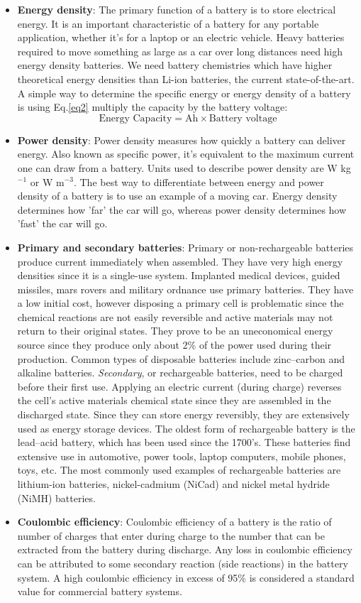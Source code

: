 \begin{itemize}
\item \textbf{Energy density}: The primary function of a battery is to store electrical energy. It is an important characteristic of a battery for any portable application, whether it’s for a laptop or an electric vehicle. Heavy batteries required to move something as large as a car over long distances need high energy density batteries. We need battery chemistries which have higher theoretical energy densities than Li-ion batteries, the current state-of-the-art. A simple way to determine the specific energy or energy density of a battery is using Eq.\ref{eq2} multiply the capacity by the battery voltage:
\begin{equation} \label{eq2}
    \text{Energy Capacity}= \text{Ah} \times \text{Battery voltage}
\end{equation}
\item \textbf{Power density}: Power density measures how quickly a battery can deliver energy. Also known as specific power, it's equivalent to the maximum current one can draw from a battery. Units used to describe power density are W kg$^{-1}$ or W m$^{-3}$. The best way to differentiate between energy and power density of a battery is to use an example of a moving car. Energy density determines how 'far' the car will go, whereas power density determines how 'fast' the car will go.
\item {\textbf{Primary and secondary batteries}}: Primary or non-rechargeable batteries produce current immediately when assembled. They have very high energy densities since it is a single-use system. Implanted medical devices, guided missiles, mars rovers and military ordnance use primary batteries. They have a low initial cost, however disposing a primary cell is problematic since the chemical reactions are not easily reversible and active materials may not return to their original states. They prove to be an uneconomical energy source since they produce only about 2\% of the power used during their production. Common types of disposable batteries include zinc–carbon and alkaline batteries. 
\textit{Secondary}, or rechargeable batteries, need to be charged before their first use. Applying an electric current (during charge) reverses the cell's active materials chemical state since they are  assembled in the discharged state. Since they can store energy reversibly, they are extensively used as energy storage devices. The oldest form of rechargeable battery is the lead–acid battery, which has been used since the 1700's. These batteries find extensive use in automotive, power tools, laptop computers, mobile phones, toys, etc. The most commonly used examples of rechargeable batteries are lithium-ion batteries, nickel-cadmium (NiCad) and nickel metal hydride (NiMH) batteries. 
\item \textbf{Coulombic efficiency}: Coulombic efficiency of a battery is the ratio of number of charges that enter during charge to the number that can be extracted from the battery during discharge.  Any loss in coulombic efficiency can be attributed to some secondary reaction (side reactions) in the battery system. A high coulombic efficiency in excess of 95\% is considered a standard value for commercial battery systems.
  
    \end{itemize}
